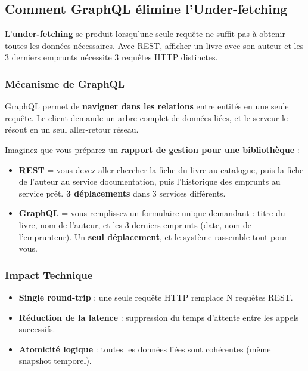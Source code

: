 \documentclass[12pt,a4paper]{article}
\begin{document}
\subsection{Comment GraphQL élimine l'Under-fetching}

\begin{infobox}[title={Définition : Under-fetching}]
L'\textbf{under-fetching} se produit lorsqu'une seule requête ne suffit pas à obtenir toutes les données nécessaires. Avec REST, afficher un livre avec son auteur et les 3 derniers emprunts nécessite 3 requêtes HTTP distinctes.
\end{infobox}

\subsubsection{Mécanisme de GraphQL}

GraphQL permet de \textbf{naviguer dans les relations} entre entités en une seule requête. Le client demande un arbre complet de données liées, et le serveur le résout en un seul aller-retour réseau.

\begin{analogybox}
Imaginez que vous préparez un \textbf{rapport de gestion pour une bibliothèque} :
\begin{itemize}
    \item \textbf{REST} = vous devez aller chercher la fiche du livre au catalogue, puis la fiche de l'auteur au service documentation, puis l'historique des emprunts au service prêt. \textbf{3 déplacements} dans 3 services différents.
    \item \textbf{GraphQL} = vous remplissez un formulaire unique demandant : titre du livre, nom de l'auteur, et les 3 derniers emprunts (date, nom de l'emprunteur). Un \textbf{seul déplacement}, et le système rassemble tout pour vous.
\end{itemize}
\end{analogybox}

\subsubsection{Impact Technique}

\begin{itemize}[leftmargin=1.5cm]
    \item \textbf{Single round-trip} : une seule requête HTTP remplace N requêtes REST.
    \item \textbf{Réduction de la latence} : suppression du temps d'attente entre les appels successifs.
    \item \textbf{Atomicité logique} : toutes les données liées sont cohérentes (même snapshot temporel).
\end{itemize}
\end{document}
